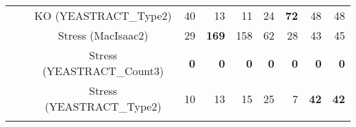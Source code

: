 \begin{table*}[t]
\begin{adjustbox}{max width=\textwidth}
\begin{tabular}{cccrrrrrrr}
  &   & KO (YEASTRACT\_Type2) & 40 & 13 & 11 & 24 & \textbf{72} & 48 & 48 \\
  &   & Stress (MacIsaac2) & 29 & \textbf{169} & 158 & 62 & 28 & 43 & 45 \\
  &   & Stress (YEASTRACT\_Count3) & \textbf{0} & \textbf{0} & \textbf{0} & \textbf{0} & \textbf{0} & \textbf{0} & \textbf{0} \\
  &   & Stress (YEASTRACT\_Type2) & 10 & 13 & 15 & 25 & 7 & \textbf{42} & \textbf{42} \\
\midrule
\botrule
\end{tabular}\end{adjustbox}{}
\end{table*}
